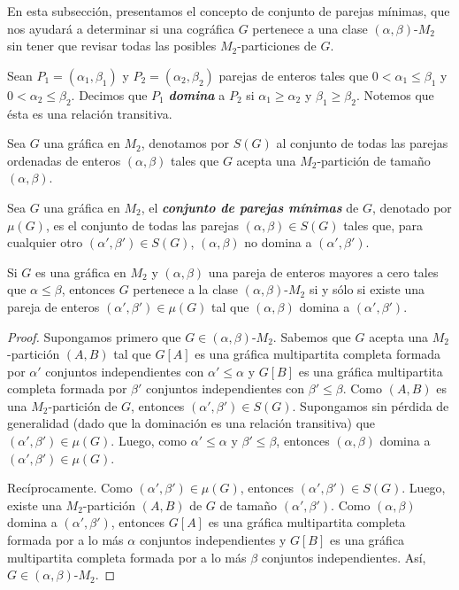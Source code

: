 En esta subsección, presentamos el concepto de conjunto de parejas mínimas, que nos ayudará a determinar si una cográfica $G$ pertenece a una clase $(\alpha, \beta)$-$M_2$ sin tener que revisar todas las posibles $M_2$-particiones de $G$.

Sean $P_1=(\alpha_1, \beta_1)$ y $P_2=(\alpha_2, \beta_2)$ parejas de enteros tales que $0 < \alpha_1 \le \beta_1$ y $0 < \alpha_2 \le \beta_2$. Decimos que $P_1$ \emph{\textbf{domina}} a $P_2$ si $\alpha_1 \geq \alpha_2$ y $\beta_1 \geq \beta_2$. Notemos que ésta es una relación transitiva.

Sea $G$ una gráfica en $M_2$, denotamos por $S(G)$ al conjunto de todas las parejas ordenadas de enteros $(\alpha, \beta)$ tales que $G$ acepta una $M_2$-partición de tamaño $(\alpha, \beta)$.

Sea $G$ una gráfica en $M_2$, el \textbf{\emph{conjunto de parejas mínimas}} de $G$, denotado por $\mu(G)$, es el conjunto de todas las parejas $(\alpha, \beta)\in S(G)$ tales que, para cualquier otro $(\alpha', \beta')\in S(G)$, $(\alpha, \beta)$ no domina a $(\alpha', \beta')$.

\begin{lemma}\label{lema_parejas_principal}
Si $G$ es una gráfica en $M_2$ y $(\alpha, \beta)$ una pareja de enteros mayores a cero tales que $\alpha \le \beta$, entonces $G$ pertenece a la clase $(\alpha, \beta)$-$M_2$ si y sólo si existe una pareja de enteros $(\alpha', \beta')\in \mu(G)$ tal que $(\alpha, \beta)$ domina a $(\alpha', \beta')$.
\end{lemma}

\begin{proof}
Supongamos primero que $G\in (\alpha, \beta)\text{-}M_2$. Sabemos que $G$
acepta una $M_2$-partición $(A,B)$ tal que $G[A]$ es una gráfica multipartita
completa formada por $\alpha'$ conjuntos independientes con $\alpha' \le
\alpha$ y $G[B]$ es una gráfica multipartita completa formada por $\beta'$
conjuntos independientes con $\beta' \le \beta$. Como $(A,B)$ es una
$M_2$-partición de $G$, entonces $(\alpha', \beta')\in S(G)$. Supongamos sin
pérdida de generalidad (dado que la dominación es una relación transitiva)
que $(\alpha', \beta')\in \mu(G)$. Luego, como $\alpha' \le \alpha$ y $\beta'
\le \beta$, entonces $(\alpha, \beta)$ domina a $(\alpha', \beta') \in \mu(G)$.

Recíprocamente. Como $(\alpha', \beta')\in \mu(G)$, entonces $(\alpha', \beta')\in S(G)$. Luego, existe una $M_2$-partición $(A,B)$ de $G$ de tamaño $(\alpha', \beta')$. Como $(\alpha, \beta)$ domina a $(\alpha', \beta')$, entonces $G[A]$ es una gráfica multipartita completa formada por a lo más $\alpha$ conjuntos independientes y $G[B]$ es una gráfica multipartita completa formada por a lo más $\beta$ conjuntos independientes. Así, $G\in (\alpha, \beta)\text{-}M_2$.
\end{proof}
